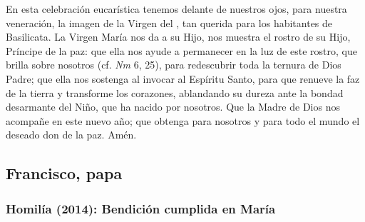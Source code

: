 \begin{body}
	En esta celebración eucarística tenemos delante de nuestros ojos, para nuestra veneración, la imagen de la Virgen del , tan querida para los habitantes de Basilicata. La Virgen María nos da a su Hijo, nos muestra el rostro de su Hijo, Príncipe de la paz: que ella nos ayude a permanecer en la luz de este rostro, que brilla sobre nosotros (cf. \emph{Nm} 6, 25), para redescubrir toda la ternura de Dios Padre; que ella nos sostenga al invocar al Espíritu Santo, para que renueve la faz de la tierra y transforme los corazones, ablandando su dureza ante la bondad desarmante del Niño, que ha nacido por nosotros. Que la Madre de Dios nos acompañe en este nuevo año; que obtenga para nosotros y para todo el mundo el deseado don de la paz. Amén.
\end{body}

\newsection

\subsection{Francisco, papa}

\subsubsection{Homilía (2014): Bendición cumplida en María}


